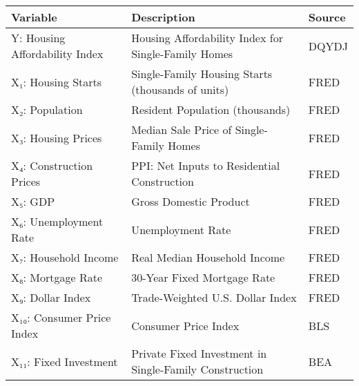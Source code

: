 \begin{tabular}{lll}
\toprule
Variable & Description & Source \\
\midrule
Y: Housing Affordability Index & Housing Affordability Index for Single-Family Homes & DQYDJ \\
X₁: Housing Starts & Single-Family Housing Starts (thousands of units) & FRED \\
X₂: Population & Resident Population (thousands) & FRED \\
X₃: Housing Prices & Median Sale Price of Single-Family Homes & FRED \\
X₄: Construction Prices & PPI: Net Inputs to Residential Construction & FRED \\
X₅: GDP & Gross Domestic Product & FRED \\
X₆: Unemployment Rate & Unemployment Rate & FRED \\
X₇: Household Income & Real Median Household Income & FRED \\
X₈: Mortgage Rate & 30-Year Fixed Mortgage Rate & FRED \\
X₉: Dollar Index & Trade-Weighted U.S. Dollar Index & FRED \\
X₁₀: Consumer Price Index & Consumer Price Index & BLS \\
X₁₁: Fixed Investment & Private Fixed Investment in Single-Family Construction & BEA \\
\bottomrule
\end{tabular}
